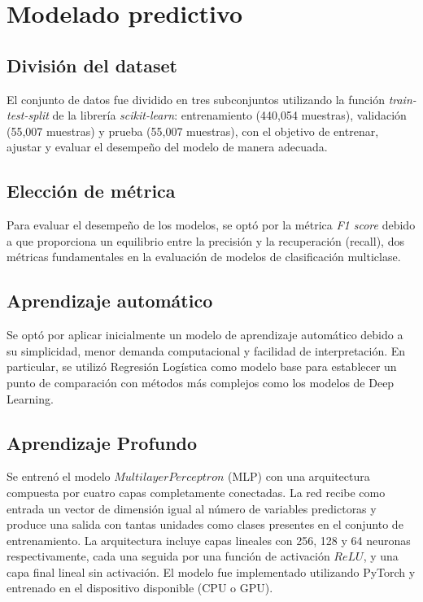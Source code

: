 \documentclass[12pt]{article}
\begin{document}


\section{Modelado predictivo}

\subsection{División del dataset}

El conjunto de datos fue dividido en tres subconjuntos utilizando la función \textit{train-test-split} de la librería 
\textit{scikit-learn}: entrenamiento (440,054 muestras), validación (55,007 muestras) y prueba (55,007 muestras), con el objetivo de entrenar,
ajustar y evaluar el desempeño del modelo de manera adecuada.

\subsection{Elección de métrica}

Para evaluar el desempeño de los modelos, se optó por la métrica \textit{F1 score} debido a que 
proporciona un equilibrio entre la precisión y la recuperación (recall), dos métricas fundamentales en la evaluación de modelos de clasificación multiclase.

\subsection{Aprendizaje automático}
Se optó por aplicar inicialmente un modelo de aprendizaje automático debido a su simplicidad, menor demanda computacional y facilidad de interpretación.
En particular, se utilizó Regresión Logística como modelo base para establecer un punto
de comparación con métodos más complejos como los modelos de Deep Learning.

\subsection{Aprendizaje Profundo}

Se entrenó el modelo $Multilayer Perceptron$ (MLP) con una arquitectura
compuesta por cuatro capas completamente conectadas. La red recibe como entrada un vector
de dimensión igual al número de variables predictoras y produce una salida con tantas 
unidades como clases presentes en el conjunto de entrenamiento. La arquitectura incluye
capas lineales con 256, 128 y 64 neuronas respectivamente, cada una seguida por una 
función de activación $ReLU$, y una capa final lineal sin activación. El modelo fue
implementado utilizando PyTorch y entrenado en el dispositivo disponible (CPU o GPU).
\end{document}
